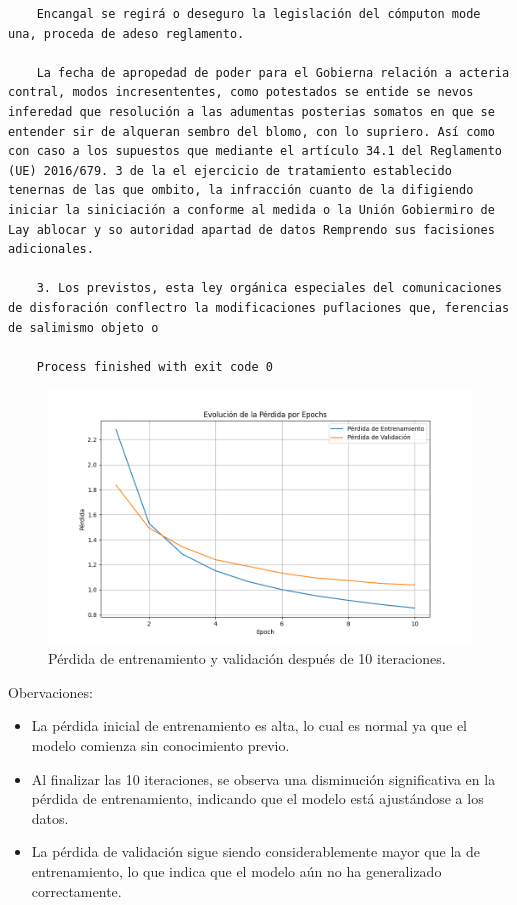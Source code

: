 \documentclass{article}
\begin{document}
{\begin{verbatim}
    Encangal se regirá o deseguro la legislación del cómputon mode una, proceda de adeso reglamento.
    
    La fecha de apropedad de poder para el Gobierna relación a acteria contral, modos incresententes, como potestados se entide se nevos inferedad que resolución a las adumentas posterias somatos en que se entender sir de alqueran sembro del blomo, con lo supriero. Así como con caso a los supuestos que mediante el artículo 34.1 del Reglamento (UE) 2016/679. 3 de la el ejercicio de tratamiento establecido tenernas de las que ombito, la infracción cuanto de la difigiendo iniciar la siniciación a conforme al medida o la Unión Gobiermiro de Lay ablocar y so autoridad apartad de datos Remprendo sus facisiones adicionales.
    
    3. Los previstos, esta ley orgánica especiales del comunicaciones de disforación conflectro la modificaciones puflaciones que, ferencias de salimismo objeto o 
    
    Process finished with exit code 0    
\end{verbatim}
}

\newpage

\begin{figure}[H]
    \centering
    \includegraphics[scale=0.4]{10.png}
    \caption{Pérdida de entrenamiento y validación después de 10 iteraciones.}
\end{figure}

{\large{Obervaciones}}:
\begin{itemize}
    \item La pérdida inicial de entrenamiento es alta, lo cual es normal ya que el modelo comienza sin conocimiento previo.
    \item Al finalizar las 10 iteraciones, se observa una disminución significativa en la pérdida de entrenamiento, indicando que el modelo está ajustándose a los datos.
    \item La pérdida de validación sigue siendo considerablemente mayor que la de entrenamiento, lo que indica que el modelo aún no ha generalizado correctamente.
\end{itemize}
\end{document}
